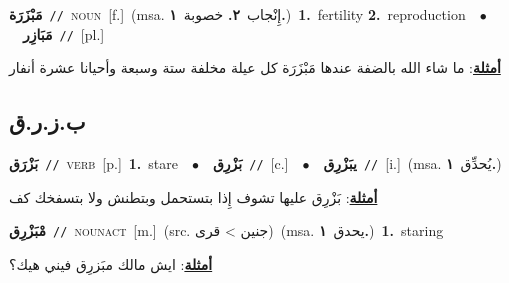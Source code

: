 \documentclass[10pt,a4paper,twoside]{article} %
\begin{document}
\begin{multicols}{2}
{\setlength\topsep{0pt}\textbf{\foreignlanguage{arabic}{مَبْزَرَة}}\ {\color{gray}\texttt{//}\color{black}}\ \textsc{noun}\ [f.]\ \color{gray}(msa. \foreignlanguage{arabic}{إِنْجاب}~\foreignlanguage{arabic}{\textbf{٢.}}  \foreignlanguage{arabic}{خصوبة}~\foreignlanguage{arabic}{\textbf{١.}})\color{black}\ \textbf{1.}~fertility  \textbf{2.}~reproduction\ \ $\bullet$\ \ \setlength\topsep{0pt}\textbf{\foreignlanguage{arabic}{مَبَازِر}}\ {\color{gray}\texttt{//}\color{black}}\ [pl.]\  \begin{flushright}\color{gray}\foreignlanguage{arabic}{\textbf{\underline{\foreignlanguage{arabic}{أمثلة}}}: ما شاء الله بالضفة عندها مَبْزَرَة كل عيلة مخلفة ستة وسبعة وأحيانا عشرة أنفار}\end{flushright}\color{black}} \vspace{2mm}

\vspace{-3mm}
\subsection*{\color{blue}\foreignlanguage{arabic}{ب.ز.ر.ق}\color{blue}{ (ntws)}} 

{\setlength\topsep{0pt}\textbf{\foreignlanguage{arabic}{بَزْرَق}}\ {\color{gray}\texttt{//}\color{black}}\ \textsc{verb}\ [p.]\ \textbf{1.}~stare\ \ $\bullet$\ \ \setlength\topsep{0pt}\textbf{\foreignlanguage{arabic}{بَزْرِق}}\ {\color{gray}\texttt{//}\color{black}}\ [c.]\ \ $\bullet$\ \ \setlength\topsep{0pt}\textbf{\foreignlanguage{arabic}{يبَزْرِق}}\ {\color{gray}\texttt{//}\color{black}}\ [i.]\ \color{gray}(msa. \foreignlanguage{arabic}{يُحدِّق}~\foreignlanguage{arabic}{\textbf{١.}})\color{black}\  \begin{flushright}\color{gray}\foreignlanguage{arabic}{\textbf{\underline{\foreignlanguage{arabic}{أمثلة}}}: بَزْرِق عليها تشوف إِذا بتستحمل وبتطنش ولا بتسفخك كف}\end{flushright}\color{black}} \vspace{2mm}

{\setlength\topsep{0pt}\textbf{\foreignlanguage{arabic}{مْبَزْرِق}}\ {\color{gray}\texttt{//}\color{black}}\ \textsc{noun\textunderscore act}\ [m.]\ (src. \color{gray}\foreignlanguage{arabic}{جنين > قرى}\color{black})\ \color{gray}(msa. \foreignlanguage{arabic}{يحدق}~\foreignlanguage{arabic}{\textbf{١.}})\color{black}\ \textbf{1.}~staring\  \begin{flushright}\color{gray}\foreignlanguage{arabic}{\textbf{\underline{\foreignlanguage{arabic}{أمثلة}}}: ايش مالك مبَزرِق فيني هيك؟}\end{flushright}\color{black}} \vspace{2mm}


\end{multicols}
\end{document}
